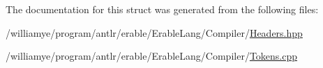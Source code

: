 The documentation for this struct was generated from the following files\+:\begin{DoxyCompactItemize}
\item 
/williamye/program/antlr/erable/\+Erable\+Lang/\+Compiler/\mbox{\hyperlink{_headers_8hpp}{Headers.\+hpp}}\item 
/williamye/program/antlr/erable/\+Erable\+Lang/\+Compiler/\mbox{\hyperlink{_tokens_8cpp}{Tokens.\+cpp}}\end{DoxyCompactItemize}
